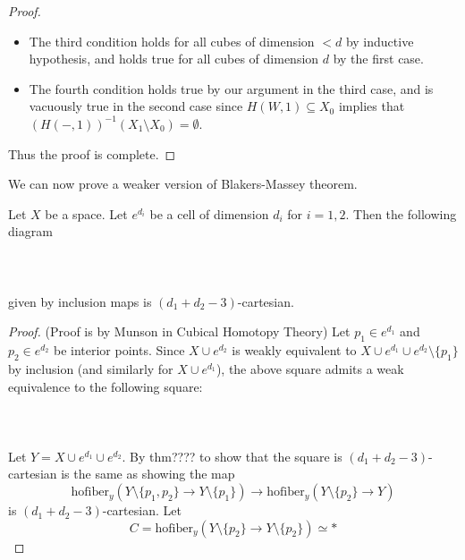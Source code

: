 \documentclass[a4paper]{article}
\begin{document}
\begin{lmm}{}{}
\begin{proof}
\begin{itemize}
\item The third condition holds for all cubes of dimension $<d$ by inductive hypothesis, and holds true for all cubes of dimension $d$ by the first case. 
\item The fourth condition holds true by our argument in the third case, and is vacuously true in the second case since $H(W,1)\subseteq X_0$ implies that $(H(-,1))^{-1}(X_1\setminus X_0)=\emptyset$. 
\end{itemize}
Thus the proof is complete. 
\end{proof}
\end{lmm}

We can now prove a weaker version of Blakers-Massey theorem. 

\begin{prp}{}{} Let $X$ be a space. Let $e^{d_i}$ be a cell of dimension $d_i$ for $i=1,2$. Then the following diagram \\~\\
\\~\\
given by inclusion maps is $(d_1+d_2-3)$-cartesian. \tcbline
\begin{proof}
(Proof is by Munson in Cubical Homotopy Theory) Let $p_1\in e^{d_1}$ and $p_2\in e^{d_2}$ be interior points. Since $X\cup e^{d_2}$ is weakly equivalent to $X\cup e^{d_1}\cup e^{d_2}\setminus\{p_1\}$ by inclusion (and similarly for $X\cup e^{d_1}$), the above square admits a weak equivalence to the following square: \\~\\
\\~\\
Let $Y=X\cup e^{d_1}\cup e^{d_2}$. By thm???? to show that the square is $(d_1+d_2-3)$-cartesian is the same as showing the map $$\text{hofiber}_y(Y\setminus\{p_1,p_2\}\to Y\setminus\{p_1\})\to\text{hofiber}_y(Y\setminus\{p_2\}\to Y)$$ is $(d_1+d_2-3)$-cartesian. Let $$C=\text{hofiber}_y(Y\setminus\{p_2\}\to Y\setminus\{p_2\})\simeq\ast$$ 


\end{proof}
\end{prp}
\end{document}
